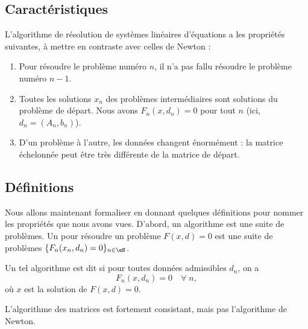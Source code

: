 \subsection{Caractéristiques}

L'algorithme de résolution de systèmes linéaires d'équations a les propriétés suivantes, à mettre en contraste avec celles de Newton :
\begin{enumerate}

	\item
		Pour résoudre le problème numéro $n$, il n'a pas fallu résoudre le problème numéro $n-1$.
	\item
		Toutes les solutions $x_n$ des problèmes intermédiaires sont solutions du problème de départ. Nous avons $F_n(x,d_n)=0$ pour tout $n$ (ici, $d_n=(A_n,b_n)$).
	\item
		D'un problème à l'autre, les données changent énormément : la matrice échelonnée peut être très différente de la matrice de départ.

\end{enumerate}

\subsection{Définitions}

	Nous allons maintenant formaliser en donnant quelques définitions pour nommer les propriétés que nous avons vues. D'abord, un algorithme est une suite de problèmes. Un  pour résoudre un problème $F(x,d)=0$ est une suite de problèmes $\{F_n(x_n,d_n)=0\}_{n\in\eN}$.

\begin{definition}
	Un tel algorithme est dit   si pour toutes données admissibles $d_n$, on a
	\begin{equation}
		F_n(x,d_n)=0\quad\forall \;n,
	\end{equation}
	où $x$ est la solution de $F(x,d)=0$.
\end{definition}
L'algorithme des matrices est fortement consistant, mais pas l'algorithme de Newton.

